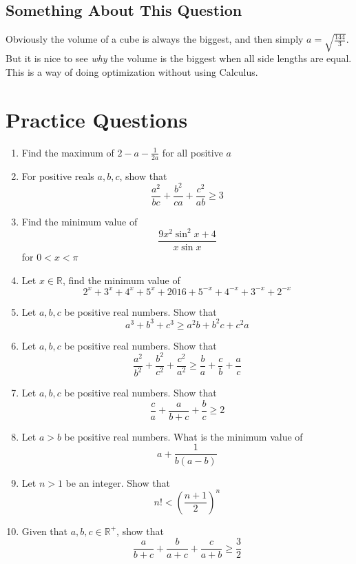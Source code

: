 \documentclass{article}
\theoremstyle{definition}
\begin{document}
\subsection*{Something About This Question}
Obviously the volume of a cube is always the biggest, and then simply $a=\sqrt{\frac{144}{3}}$. But it is nice to see \textit{why} the volume is the biggest when all side lengths are equal. This is a way of doing optimization without using Calculus.
\pagebreak


\section{Practice Questions}
\begin{enumerate}
    \item Find the maximum of $2 - a - \frac{1}{2a}$ for all positive $a$
    \item For positive reals $a, b, c$, show that $$\frac{ a^2 } { bc } + \frac{ b^2 } { ca } + \frac{ c^2 } { ab } \geq 3$$
    \item Find the minimum value of $$\frac{9x^2\sin^2 x + 4}{x\sin x}$$ for $0 < x < \pi$
    \item Let $x\in\mathbb{R}$, find the minimum value of $$2^x+3^x+4^x+5^x+2016+5^{-x}+4^{-x}+3^{-x}+2^{-x}$$
    \item Let $a, b, c$ be positive real numbers. Show that$$a^3+b^3+c^3\ge a^2b+b^2c+c^2a$$
    \item Let $a, b, c$ be positive real numbers. Show that$$\frac{a^2}{b^2}+\frac{b^2}{c^2}+\frac{c^2}{a^2}\ge \frac{b}{a}+\frac{c}{b}+\frac{a}{c}$$
    \item Let $a, b, c$ be positive real numbers. Show that$$\frac{c}{a}+\frac{a}{b+c}+\frac{b}{c}\ge 2$$
    \item Let $a>b$ be positive real numbers. What is the minimum value of$$a+\frac{1}{b(a-b)}$$
    \item Let $n>1$ be an integer. Show that$$n!<\left(\frac{n+1}{2}\right)^n$$
    \item Given that $a,b,c\in\mathbb{R}^+$, show that $$\frac{a}{b+c}+\frac{b}{a+c}+\frac{c}{a+b}\ge \frac{3}{2}$$
\end{enumerate}
\end{document}
